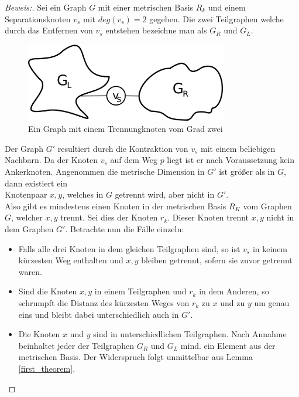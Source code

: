 \begin{proof}[Beweis:]
Sei ein Graph $G$ mit einer metrischen Basis $R_k$ und einem Separationsknoten $v_s$ mit $deg(v_s)=2$ gegeben. Die zwei Teilgraphen welche durch das Entfernen von $v_s$ entstehen bezeichne man als $G_R$ und $G_L$.
\begin{figure}[ht]
\centering
\includegraphics*[width = 250pt]{bilder/proof4,2.pdf}
\caption{Ein Graph mit einem Trennungknoten vom Grad zwei}
\end{figure}
\newline Der Graph $G'$ resultiert durch die Kontraktion von $v_s$ mit einem beliebigen Nachbarn. Da der Knoten $v_s$ auf dem Weg $p$ liegt ist er nach Voraussetzung kein Ankerknoten.\newline
Angenommen die metrische Dimension in $G'$ ist größer als in $G$, dann existiert ein\\Knotenpaar $x,y$, welches in $G$ getrennt wird, aber nicht in $G'$.\\Also gibt es mindestens einen Knoten in der metrischen Basis $R_K$ vom Graphen $G$, welcher $x,y$ trennt. Sei dies der Knoten $r_k$. Dieser Knoten trennt $x,y$ nicht in dem Graphen $G'$. 
Betrachte nun die Fälle einzeln:
\begin{itemize}
\item Falls alle drei Knoten in dem gleichen Teilgraphen sind, so ist $v_s$ in keinem kürzesten Weg enthalten und $x,y$ bleiben getrennt, sofern sie zuvor getrennt waren.
\item Sind die Knoten $x,y$ in einem Teilgraphen und $r_k$ in dem Anderen, so schrumpft die Distanz des kürzesten Weges von $r_k$ zu $x$ und zu $y$ um genau eins und bleibt dabei unterschiedlich auch in $G'$.
\item Die Knoten $x$ und $y$ sind in unterschiedlichen Teilgraphen. Nach Annahme beinhaltet jeder der Teilgraphen $G_R$ und $G_L$ mind. ein Element aus der metrischen Basis. Der Widerspruch folgt unmittelbar aus Lemma \ref{first_theorem}.
\end{itemize}
\end{proof}
